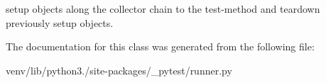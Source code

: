 \begin{DoxyVerb}setup objects along the collector chain to the test-method
    and teardown previously setup objects.\end{DoxyVerb}
 

The documentation for this class was generated from the following file\+:\begin{DoxyCompactItemize}
\item 
venv/lib/python3./site-\/packages/\+\_\+pytest/runner.\+py\end{DoxyCompactItemize}
